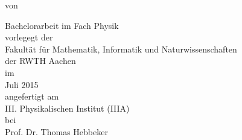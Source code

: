 \makeatletter
\begin{titlepage}
\begin{center}

\Huge \@title

\vspace{30mm}

\large von \\

\vspace{5mm}

\LARGE \@author

\vspace{30mm}

\LARGE Bachelorarbeit im Fach Physik \\ \vspace{5mm}
\large vorlegegt der \\
\LARGE Fakultät für Mathematik, Informatik und Naturwissenschaften \\
der RWTH Aachen \\ \vspace{5mm}
\large im \\ \LARGE Juli 2015 \\ \vspace{5mm}
\large angefertigt am \\ \LARGE III. Physikalischen Institut (IIIA) \\ \vspace{5mm}
\large bei \\ \LARGE Prof. Dr. Thomas Hebbeker \vspace{5mm}

\end{center}
\end{titlepage}
\makeatother